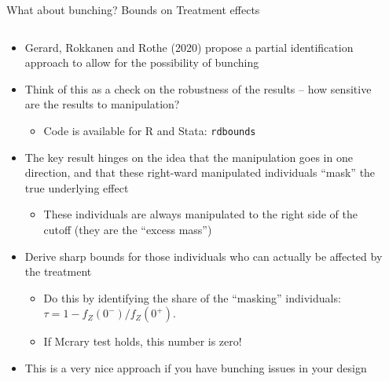 \documentclass[notes,11pt, aspectratio=169]{beamer}
\begin{document}
  \begin{frame}{What about bunching? Bounds on Treatment effects}
    \begin{columns}[onlytextwidth, T] %
      \begin{column}{\textwidth}
        \begin{itemize}
        \item Gerard, Rokkanen and Rothe (2020) propose a partial
          identification approach to allow for the possibility of
          bunching
        \item Think of this as a check on the robustness of the
          results -- how sensitive are the results to manipulation?
          \begin{itemize}
          \item Code is available for R and Stata: \texttt{rdbounds}
          \end{itemize}
        \item The key result hinges on the idea that the manipulation
          goes in one direction, and that these right-ward
          manipulated individuals ``mask'' the true underlying effect
          \begin{itemize}
          \item These individuals are always manipulated to the right
            side of the cutoff (they are the ``excess mass'')
          \end{itemize}
        \item Derive sharp bounds for those individuals who can
            actually be affected by the treatment
          \begin{itemize}
          \item Do this by identifying the share of the ``masking'' individuals: $\tau = 1- f_{Z}(0^{-})/f_{Z}(0^{+})$.
          \item If Mcrary test holds, this number is zero!
          \end{itemize}
        \item This is a very nice approach if you have bunching issues in your design
        \end{itemize}
      \end{column}%
      \hfill%
      \begin{column}{.4\textwidth}
      \end{column}%
    \end{columns}
\end{frame}
\end{document}
